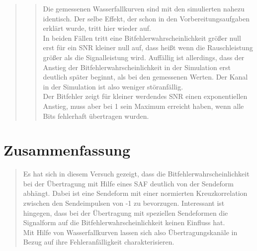 \begin{quote}
\begin{quote}
       \vspace{2em}    
    
    Die gemessenen Wasserfallkurven sind mit den simulierten nahezu identisch. Der selbe Effekt, der schon in den
    Vorbereitungsaufgaben erklärt wurde, tritt hier wieder auf.\\
    In beiden Fällen tritt eine Bitfehlerwahrscheinlichkeit größer null erst für ein SNR kleiner null auf, dass heißt
    wenn die Rauschleistung größer als die Signalleistung wird. Auffällig ist allerdings, dass der Anstieg der
    Bitfehlerwahrscheinlichkeit in der Simulation erst deutlich später beginnt, als bei den gemessenen Werten. Der Kanal
    in der Simulation ist also weniger störanfällig.\\
    Der Bitfehler zeigt für kleiner werdendes SNR einen exponentiellen Anstieg, muss aber bei 1 sein Maximum
    erreicht haben, wenn alle Bits fehlerhaft übertragen wurden.
    
    \end{quote}
     
\end{quote}

\section{Zusammenfassung}
\begin{quote}
	
	Es hat sich in diesem Versuch gezeigt, dass die Bitfehlerwahrscheinlichkeit bei der Übertragung mit Hilfe eines SAF
	deutlich von der Sendeform abhängt. Dabei ist eine Sendeform mit einer normierten Kreuzkorrelation zwischen den
	Sendeimpulsen von -1 zu bevorzugen. Interessant ist hingegen, dass bei der Übertragung mit speziellen Sendeformen die
	Signalform auf die Bitfehlerwahrscheinlichkeit keinen Einfluss hat.\\
	Mit Hilfe von Wasserfallkurven lassen sich also Übertragungskanäle in Bezug auf ihre Fehleranfälligkeit
	charakterisieren.
 
    
\end{quote} %



\newpage

